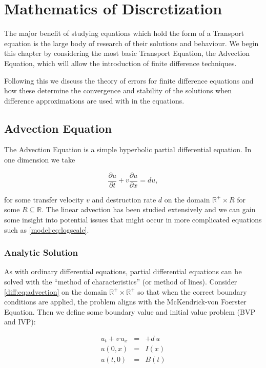 \documentclass[../main.tex]{subfiles}
\begin{document}
  \chapter{Mathematics of Discretization}\label{chapter:fdes}
  The major benefit of studying equations which hold the form of a Transport equation is the large body of research of their solutions and behaviour. We begin this chapter by considering the most basic Transport Equation, the Advection Equation, which will allow the introduction of finite difference techniques.

  Following this we discuss the theory of errors for finite difference equations and how these determine the convergence and stability of the solutions when difference approximations are used with in the equations.

  \section{Advection Equation}
  The Advection Equation is a simple hyperbolic partial differential equation. In one dimension we take

  \begin{equation} \label{diff:eq:advection}
    \frac{\partial u}{\partial t} + v \frac{\partial u}{\partial x} = d u,
  \end{equation}

  for some transfer velocity $v$ and destruction rate $d$ on the domain $\mathbb{R}^+ \times R$ for some $R \subseteq \mathbb{R}$. The linear advection has been studied extensively and we can gain some insight into potential issues that might occur in more complicated equations such as \autoref{model:eq:logscale}.

  \subsection{Analytic Solution}
  As with ordinary differential equations, partial differential equations can be solved with the ``method of characteristics'' (or method of lines). Consider \autoref{diff:eq:advection} on the domain $\mathbb{R}^+ \times \mathbb{R}^+$ so that when the correct boundary conditions are applied, the problem aligns with the McKendrick-von Foerster Equation. Then we define some boundary value and initial value problem (BVP and IVP):

  \begin{eqnarray} \label{diff:eq:advectionbvp}
    u_t + v \, u_x  &=& + d \, u \nonumber \\
    u(0, x) &=& I(x) \nonumber \\
    u(t, 0) &=& B(t)
  \end{eqnarray}
\end{document}
